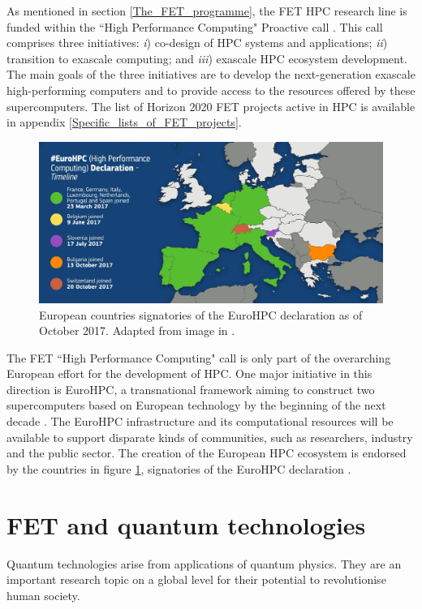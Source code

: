As mentioned in section \ref{The_FET_programme}, the FET HPC research line is funded within the ``High Performance Computing" Proactive call \cite{HPC}. This call comprises three initiatives: \textit{i}) co-design of HPC systems and applications; \textit{ii}) transition to exascale computing; and \textit{iii}) exascale HPC ecosystem development. The main goals of the three initiatives are to develop the next-generation exascale high-performing computers and to provide access to the resources offered by these supercomputers. The list of Horizon 2020 FET projects active in HPC is available in appendix \ref{Specific_lists_of_FET_projects}.

\begin{figure}[!t] 
 \begin{center}
 \includegraphics[scale=0.2]{Images/EuroHPC.jpg}
 \caption{European countries signatories of the EuroHPC declaration as of October 2017. Adapted from image in \cite{EuroHPC_countries}.}
 \label{EuroHPC_image}
 \end{center}
\end{figure}

The FET ``High Performance Computing" call is only part of the overarching European effort for the development of HPC. One major initiative in this direction is EuroHPC, a transnational framework aiming to construct two supercomputers based on European technology by the beginning of the next decade \cite{EuroHPC}. The EuroHPC infrastructure and its computational resources will be available to support disparate kinds of communities, such as researchers, industry and the public sector. The creation of the European HPC ecosystem is endorsed by the countries in figure \ref{EuroHPC_image}, signatories of the EuroHPC declaration \cite{EuroHPC_declaration}.  

\section{FET and quantum technologies} \label{FET_and_quantum_technologies}
Quantum technologies arise from applications of quantum physics. They are an important research topic on a global level for their potential to revolutionise human society.

